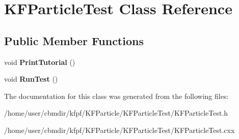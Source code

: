 \hypertarget{classKFParticleTest}{}\section{K\+F\+Particle\+Test Class Reference}
\label{classKFParticleTest}
\subsection*{Public Member Functions}
\begin{DoxyCompactItemize}
\item 
void {\bfseries Print\+Tutorial} ()\hypertarget{classKFParticleTest_aabfadfc17ea98d609d51a560853ca602}{}\label{classKFParticleTest_aabfadfc17ea98d609d51a560853ca602}

\item 
void {\bfseries Run\+Test} ()\hypertarget{classKFParticleTest_af22048f201d269dd1831027622f3abf0}{}\label{classKFParticleTest_af22048f201d269dd1831027622f3abf0}

\end{DoxyCompactItemize}


The documentation for this class was generated from the following files\+:\begin{DoxyCompactItemize}
\item 
/home/user/cbmdir/kfpf/\+K\+F\+Particle/\+K\+F\+Particle\+Test/K\+F\+Particle\+Test.\+h\item 
/home/user/cbmdir/kfpf/\+K\+F\+Particle/\+K\+F\+Particle\+Test/K\+F\+Particle\+Test.\+cxx\end{DoxyCompactItemize}
